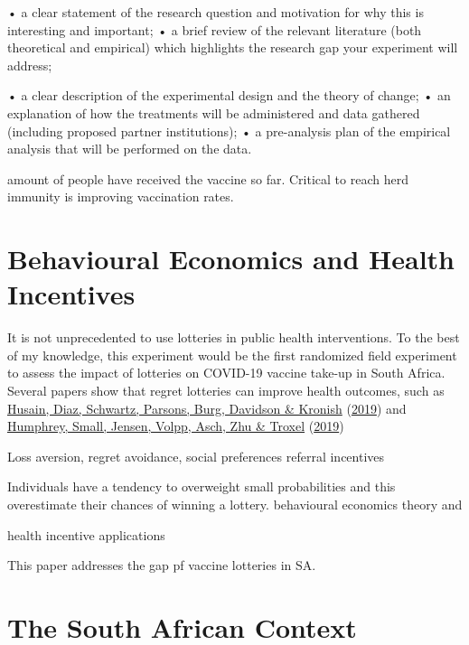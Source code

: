 \documentclass[11pt,preprint, authoryear]{elsarticle}
\numberwithin{equation}{section}
\numberwithin{figure}{section}
\numberwithin{table}{section}
\begin{document}
• a clear statement of the research question and motivation for why this
is interesting and important; • a brief review of the relevant
literature (both theoretical and empirical) which highlights the
research gap your experiment will address;

• a clear description of the experimental design and the theory of
change; • an explanation of how the treatments will be administered and
data gathered (including proposed partner institutions); • a
pre-analysis plan of the empirical analysis that will be performed on
the data.

amount of people have received the vaccine so far. Critical to reach
herd immunity is improving vaccination rates.

\hypertarget{behavioural-economics-and-health-incentives}{%
\section{\texorpdfstring{Behavioural Economics and Health Incentives
\label{lit}}{Behavioural Economics and Health Incentives }}\label{behavioural-economics-and-health-incentives}}

It is not unprecedented to use lotteries in public health interventions.
To the best of my knowledge, this experiment would be the first
randomized field experiment to assess the impact of lotteries on
COVID-19 vaccine take-up in South Africa. Several papers show that
regret lotteries can improve health outcomes, such as
\protect\hyperlink{ref-regr}{Husain, Diaz, Schwartz, Parsons, Burg,
Davidson \& Kronish} (\protect\hyperlink{ref-regr}{2019}) and
\protect\hyperlink{ref-adhere}{Humphrey, Small, Jensen, Volpp, Asch, Zhu
\& Troxel} (\protect\hyperlink{ref-adhere}{2019})

Loss aversion, regret avoidance, social preferences referral incentives

Individuals have a tendency to overweight small probabilities and this
overestimate their chances of winning a lottery. behavioural economics
theory and

health incentive applications

This paper addresses the gap pf vaccine lotteries in SA.

\hypertarget{the-south-african-context}{%
\section{\texorpdfstring{The South African Context
\label{context}}{The South African Context }}\label{the-south-african-context}}
\end{document}
